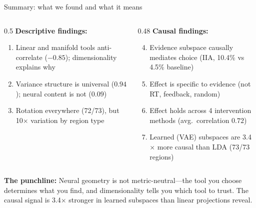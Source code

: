 \documentclass[aspectratio=169,11pt]{beamer}
\begin{document}
\begin{frame}{Summary: what we found and what it means}
\begin{columns}[T]
\begin{column}{0.5\textwidth}
\textbf{Descriptive findings:}
\begin{enumerate}
  \item Linear and manifold tools anti-correlate ($-0.85$); dimensionality explains why
  \item Variance structure is universal ($0.94$); neural content is not ($0.09$)
  \item Rotation everywhere (72/73), but 10$\times$ variation by region type
\end{enumerate}
\end{column}
\begin{column}{0.48\textwidth}
\textbf{Causal findings:}
\begin{enumerate}
  \setcounter{enumi}{3}
  \item Evidence subspace causally mediates choice (IIA, 10.4\% vs 4.5\% baseline)
  \item Effect is specific to evidence (not RT, feedback, random)
  \item Effect holds across 4 intervention methods (avg.\ correlation $0.72$)
  \item Learned (VAE) subspaces are 3.4$\times$ more causal than LDA (73/73 regions)
\end{enumerate}
\end{column}
\end{columns}

\vspace{0.5em}
{\small \textbf{The punchline:} Neural geometry is not metric-neutral---the tool you choose determines what you find, and dimensionality tells you which tool to trust. The causal signal is 3.4$\times$ stronger in learned subspaces than linear projections reveal.}
\end{frame}


\begin{frame}[plain]
\vfill
\begin{center}
  \setlength{\fboxrule}{2.5pt}%
\end{center}
\vfill
\end{frame}
\end{document}
